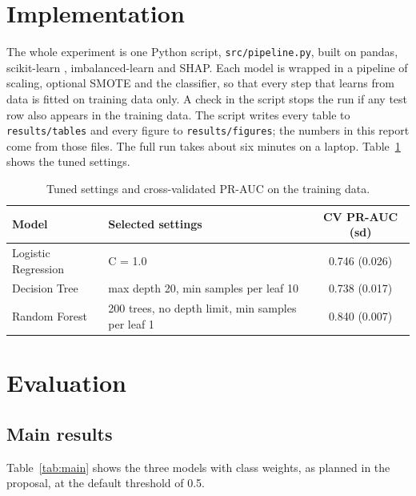 \documentclass[12pt,a4paper]{article}
\begin{document}
\section{Implementation}\label{sec:impl}
The whole experiment is one Python script, \texttt{src/pipeline.py}, built on pandas, scikit-learn \citep{pedregosa2011scikit}, imbalanced-learn and SHAP. Each model is wrapped in a pipeline of scaling, optional SMOTE and the classifier, so that every step that learns from data is fitted on training data only. A check in the script stops the run if any test row also appears in the training data. The script writes every table to \texttt{results/tables} and every figure to \texttt{results/figures}; the numbers in this report come from those files. The full run takes about six minutes on a laptop. Table~\ref{tab:tune} shows the tuned settings.

\begin{table}[H]
\centering\small
\caption{Tuned settings and cross-validated PR-AUC on the training data.}\label{tab:tune}
\begin{tabular}{llc}
\toprule
Model & Selected settings & CV PR-AUC (sd) \\
\midrule
Logistic Regression & C = 1.0 & 0.746 (0.026) \\
Decision Tree & max depth 20, min samples per leaf 10 & 0.738 (0.017) \\
Random Forest & 200 trees, no depth limit, min samples per leaf 1 & 0.840 (0.007) \\
\bottomrule
\end{tabular}
\end{table}

\section{Evaluation}\label{sec:eval}

\subsection{Main results}
Table~\ref{tab:main} shows the three models with class weights, as planned in the proposal, at the default threshold of 0.5.

\begin{table}[H]
\centering\small
\caption{Test results with class weights and threshold 0.5 (85{,}118 test transactions, 142 frauds).}\label{tab:main}
\end{table}
\end{document}
